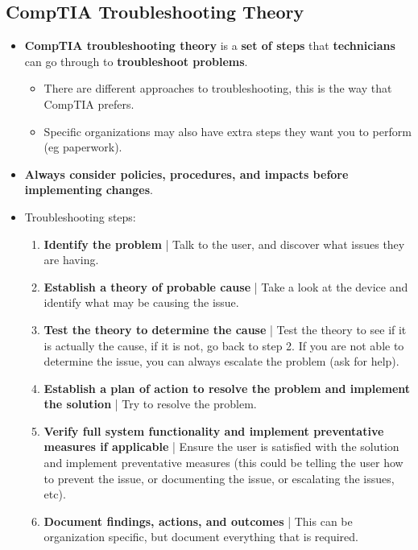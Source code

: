 \documentclass{article}
\begin{document}
    \subsection*{CompTIA Troubleshooting Theory}
    \begin{itemize}
        \item \textbf{CompTIA troubleshooting theory} is a \textbf{set of steps} that \textbf{technicians} can go through to \textbf{troubleshoot problems}.
        \begin{itemize}
            \item There are different approaches to troubleshooting, this is the way that CompTIA prefers.
            \item Specific organizations may also have extra steps they want you to perform (eg paperwork).
        \end{itemize}
        \item \textbf{Always consider policies, procedures, and impacts before implementing changes}.
        \item Troubleshooting steps:
        \begin{enumerate}
            \item \textbf{Identify the problem} | Talk to the user, and discover what issues they are having.
            \item \textbf{Establish a theory of probable cause} | Take a look at the device and identify what may be causing the issue.
            \item \textbf{Test the theory to determine the cause} | Test the theory to see if it is actually the cause, if it is not, go back to step 2. If you are not able to determine the issue, you can always escalate the problem (ask for help).
            \item \textbf{Establish a plan of action to resolve the problem and implement the solution} | Try to resolve the problem.
            \item \textbf{Verify full system functionality and implement preventative measures if applicable} | Ensure the user is satisfied with the solution and implement preventative measures (this could be telling the user how to prevent the issue, or documenting the issue, or escalating the issues, etc).
            \item \textbf{Document findings, actions, and outcomes} | This can be organization specific, but document everything that is required.
        \end{enumerate}
    \end{itemize}

    
\end{document}
